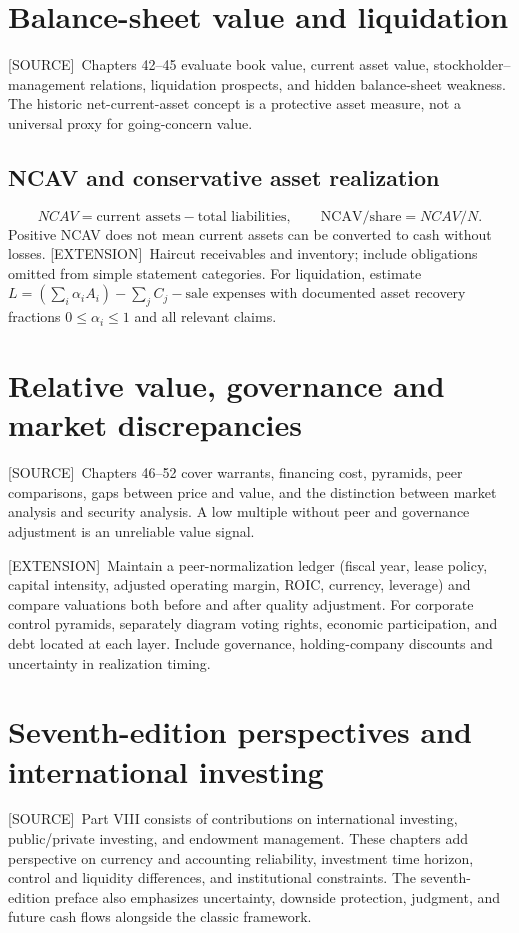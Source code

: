 \documentclass[11pt,letterpaper]{article}
\newcommand{\src}{\textsf{\color{sea}[SOURCE]}}
\newcommand{\ext}{\textsf{\color{gold}[EXTENSION]}}
\begin{document}
\section{Balance-sheet value and liquidation}
\src\ Chapters 42--45 evaluate book value, current asset value, stockholder--management relations, liquidation prospects, and hidden balance-sheet weakness. The historic net-current-asset concept is a protective asset measure, not a universal proxy for going-concern value.

\subsection{NCAV and conservative asset realization}
\[
NCAV=\text{current assets}-\text{total liabilities},\qquad
\text{NCAV/share}=NCAV/N.
\]
Positive NCAV does not mean current assets can be converted to cash without losses. \ext\ Haircut receivables and inventory; include obligations omitted from simple statement categories. For liquidation, estimate $L=(\sum_i \alpha_i A_i)-\sum_j C_j-\text{sale expenses}$ with documented asset recovery fractions $0\leq\alpha_i\leq1$ and all relevant claims.

\section{Relative value, governance and market discrepancies}
\src\ Chapters 46--52 cover warrants, financing cost, pyramids, peer comparisons, gaps between price and value, and the distinction between market analysis and security analysis. A low multiple without peer and governance adjustment is an unreliable value signal.

\ext\ Maintain a peer-normalization ledger (fiscal year, lease policy, capital intensity, adjusted operating margin, ROIC, currency, leverage) and compare valuations both before and after quality adjustment. For corporate control pyramids, separately diagram voting rights, economic participation, and debt located at each layer. Include governance, holding-company discounts and uncertainty in realization timing.

\section{Seventh-edition perspectives and international investing}
\src\ Part VIII consists of contributions on international investing, public/private investing, and endowment management. These chapters add perspective on currency and accounting reliability, investment time horizon, control and liquidity differences, and institutional constraints. The seventh-edition preface also emphasizes uncertainty, downside protection, judgment, and future cash flows alongside the classic framework.
\end{document}
